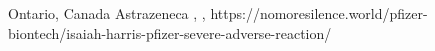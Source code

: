           {Ontario, Canada}
          {}
          {Astrazeneca}
          {}
          {
            ,
            ,
          }
          {https://nomoresilence.world/pfizer-biontech/isaiah-harris-pfizer-severe-adverse-reaction/}


